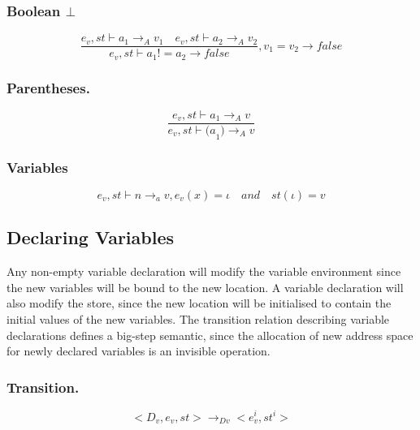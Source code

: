 \subsubsection{Boolean $\bot$}
\begin{equation}
	\frac { { e }_{ v },st\vdash { a }_{ 1 }{ \rightarrow  }_{ A }{ v }_{ 1 }\quad { e }_{ v },st\vdash { a }_{ 2 }{ \rightarrow  }_{ A }{ v }_{ 2 } }{ { e }_{ v },st\vdash { a }_{ 1 }!={ a }_{ 2 }{ \rightarrow  }false } ,{ v }_{ 1 }={ v }_{ 2 }\rightarrow false
\end{equation}


\subsubsection{Parentheses.}
\begin{equation}
	\frac { { e }_{ v },st\vdash { a }_{ 1 }{ \rightarrow  }_{ A }{ v } }{ { e }_{ v },st\vdash { (a }_{ 1 }){ \rightarrow  }_{ A }{ v } }
\end{equation}


\subsubsection{Variables}
\begin{equation}
	{ e }_{ v },st\vdash n{ \rightarrow  }_{ a }v, { e }_{ v }(x)=\iota\quad and\quad st(\iota )=v
\end{equation}


\subsection*{Declaring Variables}
Any non-empty variable declaration will modify the variable environment since the new variables will be bound to the new location.
A variable declaration will also modify the store, since the new location will be initialised to contain the initial values of the new variables.
The transition relation describing variable declarations defines a big-step semantic, since the allocation of new address space for newly declared variables is an invisible operation.

\subsubsection{Transition.}
\begin{equation}
<{ D }_{ v },{ e }_{ v },st>{ \rightarrow  }_{ Dv }<{ e }_{ v }^{ i },{ st }^{ i }>
\end{equation}


